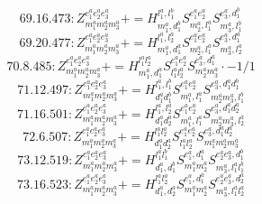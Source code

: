 \documentclass[letterpaper,10pt,fleqn,leqno,onecolumn]{article}
\begin{document}
\begin{equation} \;\;\;\;\;\;  69.16.473: Z^{e_{1}^{a}e_{2}^{a}e_{3}^{a}}_{m_{1}^{a}m_{2}^{a}m_{3}^{a}}+=H^{l_{1}^{a},l_{1}^{b}}_{m_{1}^{a},d_{1}^{b}}S^{e_{1}^{a}e_{2}^{a}}_{m_{2}^{a},l_{1}^{a}}S^{e_{3}^{a},d_{1}^{b}}_{m_{3}^{a},l_{1}^{b}} \end{equation}
\begin{equation} \;\;\;\;\;\;  69.20.477: Z^{e_{1}^{a}e_{2}^{a}e_{3}^{a}}_{m_{1}^{a}m_{2}^{a}m_{3}^{a}}+=H^{l_{1}^{a},l_{2}^{a}}_{m_{1}^{a},d_{1}^{a}}S^{e_{1}^{a}e_{2}^{a}}_{m_{2}^{a},l_{1}^{a}}S^{e_{3}^{a},d_{1}^{a}}_{m_{3}^{a},l_{2}^{a}} \end{equation}
\begin{equation} \;\;\;\;\;\;  70.8.485: Z^{e_{1}^{a}e_{2}^{a}e_{3}^{a}}_{m_{1}^{a}m_{2}^{a}m_{3}^{a}}+=H^{l_{1}^{a}l_{2}^{a}}_{m_{1}^{a},d_{1}^{a}}S^{e_{1}^{a}e_{2}^{a}}_{l_{1}^{a}l_{2}^{a}}S^{e_{3}^{a},d_{1}^{a}}_{m_{2}^{a}m_{3}^{a}}\cdot -1/1 \end{equation}
\begin{equation} \;\;\;\;\;\;  71.12.497: Z^{e_{1}^{a}e_{2}^{a}e_{3}^{a}}_{m_{1}^{a}m_{2}^{a}m_{3}^{a}}+=H^{l_{1}^{a},l_{1}^{b}}_{d_{1}^{a}d_{1}^{b}}S^{e_{1}^{a}e_{2}^{a}}_{m_{1}^{a},l_{1}^{a}}S^{e_{3}^{a},d_{1}^{a}d_{1}^{b}}_{m_{2}^{a}m_{3}^{a},l_{1}^{b}} \end{equation}
\begin{equation} \;\;\;\;\;\;  71.16.501: Z^{e_{1}^{a}e_{2}^{a}e_{3}^{a}}_{m_{1}^{a}m_{2}^{a}m_{3}^{a}}+=H^{l_{1}^{a},l_{2}^{a}}_{d_{1}^{a}d_{2}^{a}}S^{e_{1}^{a}e_{2}^{a}}_{m_{1}^{a},l_{1}^{a}}S^{e_{3}^{a},d_{1}^{a}d_{2}^{a}}_{m_{2}^{a}m_{3}^{a},l_{2}^{a}} \end{equation}
\begin{equation} \;\;\;\;\;\;  72.6.507: Z^{e_{1}^{a}e_{2}^{a}e_{3}^{a}}_{m_{1}^{a}m_{2}^{a}m_{3}^{a}}+=H^{l_{1}^{a}l_{2}^{a}}_{d_{1}^{a}d_{2}^{a}}S^{e_{1}^{a}e_{2}^{a}}_{l_{1}^{a}l_{2}^{a}}S^{e_{3}^{a},d_{1}^{a}d_{2}^{a}}_{m_{1}^{a}m_{2}^{a}m_{3}^{a}} \end{equation}
\begin{equation} \;\;\;\;\;\;  73.12.519: Z^{e_{1}^{a}e_{2}^{a}e_{3}^{a}}_{m_{1}^{a}m_{2}^{a}m_{3}^{a}}+=H^{l_{1}^{a}l_{1}^{b}}_{d_{1}^{a},d_{1}^{b}}S^{e_{1}^{a},d_{1}^{a}}_{m_{1}^{a}m_{2}^{a}}S^{e_{2}^{a}e_{3}^{a},d_{1}^{b}}_{m_{3}^{a},l_{1}^{a}l_{1}^{b}} \end{equation}
\begin{equation} \;\;\;\;\;\;  73.16.523: Z^{e_{1}^{a}e_{2}^{a}e_{3}^{a}}_{m_{1}^{a}m_{2}^{a}m_{3}^{a}}+=H^{l_{1}^{a}l_{2}^{a}}_{d_{1}^{a},d_{2}^{a}}S^{e_{1}^{a},d_{1}^{a}}_{m_{1}^{a}m_{2}^{a}}S^{e_{2}^{a}e_{3}^{a},d_{2}^{a}}_{m_{3}^{a},l_{1}^{a}l_{2}^{a}} \end{equation}
\end{document}
